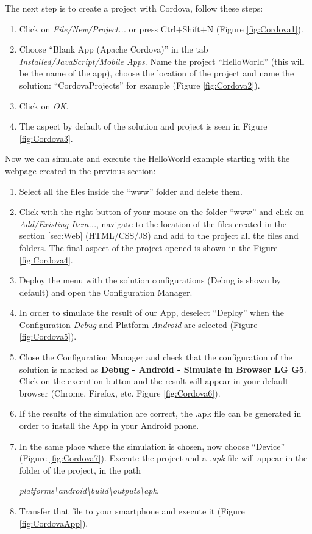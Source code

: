 \FloatBarrier
The next step is to create a project with Cordova, follow these steps:

\begin{enumerate}
    \item Click on \textit{File/New/Project...} or press Ctrl+Shift+N (Figure \ref{fig:Cordova1}).
    \item Choose ``Blank App (Apache Cordova)'' in the tab \textit{Installed/JavaScript/Mobile Apps}. Name the project ``HelloWorld'' (this will be the name of the app), choose the location of the project and name the solution: ``CordovaProjects'' for example (Figure \ref{fig:Cordova2}).
    \item Click on \textit{OK}.
    \item The aspect by default of the solution and project is seen in Figure \ref{fig:Cordova3}.
\end{enumerate}


\newpage
Now we can simulate and execute the HelloWorld example starting with the webpage created in the previous section:

\begin{enumerate}
    \item Select all the files inside the ``www'' folder and delete them.
    \item Click with the right button of your mouse on the folder ``www'' and click on \textit{Add/Existing Item...}, navigate to the location of the files created in the section \ref{sec:Web} (HTML/CSS/JS) and add to the project all the files and folders. The final aspect of the project opened is shown in the Figure \ref{fig:Cordova4}.
    \item Deploy the menu with the solution configurations (Debug is shown by default) and open the Configuration Manager.
    \item In order to simulate the result of our App, deselect ``Deploy'' when the Configuration \textit{Debug} and Platform \textit{Android} are selected (Figure \ref{fig:Cordova5}).
    \item Close the Configuration Manager and check that the configuration of the solution is marked as \textbf{Debug - Android - Simulate in Browser LG G5}. Click on the execution button and the result will appear in your default browser (Chrome, Firefox, etc. Figure \ref{fig:Cordova6}).
    \item If the results of the simulation are correct, the .apk file can be generated in order to install the App in your Android phone.
    \item In the same place where the simulation is chosen, now choose ``Device'' (Figure \ref{fig:Cordova7}). Execute the project and a \textit{.apk} file will appear in the folder of the project, in the path 
    
    \textit{platforms\textbackslash android\textbackslash build\textbackslash outputs\textbackslash apk}.
    
    \item Transfer that file to your smartphone and execute it (Figure \ref{fig:CordovaApp}).
\end{enumerate}

